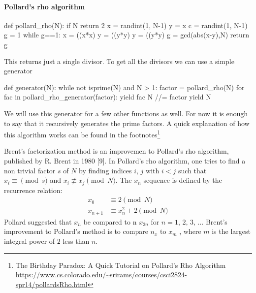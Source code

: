 \paragraph*{Pollard's rho algorithm}
%
\begin{pythoncode}
def pollard_rho(N):
        if N%
                return 2
        x = randint(1, N-1)
        y = x
        c = randint(1, N-1)
        g = 1
        while g==1:             
                x = ((x*x)%
                y = ((y*y)%
                y = ((y*y)%
                g = gcd(abs(x-y),N)
        return g
\end{pythoncode}
%
This returns just a single divisor. To get all the divisors we can use a simple generator
%
\begin{pythoncode}
	def generator(N):
	    while not isprime(N) and N > 1:
	        factor = pollard_rho(N)
	        for fac in pollard_rho_generator(factor):
	            yield fac
	        N //= factor
	    yield N
\end{pythoncode}
%
We will use this generator for a few other functions as well. For now it is enough
to say that it recursively generates the prime factors. A quick explanation of how this algorithm 
works can be found in the footnotes\footnote{The Birthday Paradox: A Quick Tutorial on Pollard's Rho Algorithm
\url{https://www.cs.colorado.edu/~srirams/courses/csci2824-spr14/pollardsRho.html}}  

Brent's factorization method is an improvemen to Pollard's rho algorithm,
published by R. Brent in 1980 [9]. In Pollard's rho algorithm, one tries to find a 
non trivial factor $s$ of $N$ by finding indices $i$, $j$ with $i < j$ such that $x_i \equiv \pmod{s}$ and
$x_i \not\equiv x_j \pmod{N}$. The $x_n$ sequence is defined by the recurrence relation:
\begin{align*}
	x_0 & \equiv 2 \pmod{N} \\
	x_{n+1} & \equiv x_{n}^2 + 2 \pmod{N}
\end{align*}
Pollard suggested that $x_n$ be compared to n $x_{2n}$ for $n = 1,\,2,\,3,\,\ldots$ Brent's
improvement to Pollard's method is to compare $n_x$ to $x_m$ , where $m$ is the largest integral
power of $2$ less than $n$.
%
